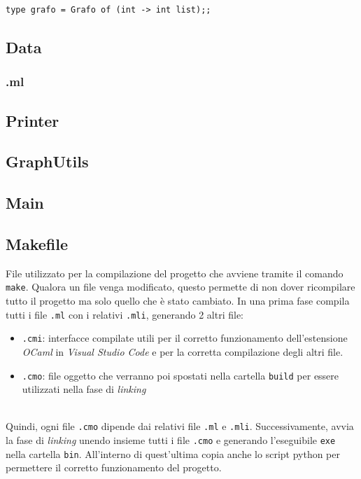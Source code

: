 \begin{lstlisting}[style=caml]
	type grafo = Grafo of (int -> int list);;
\end{lstlisting}

\subsection{Data}
\subsubsection{.ml}

\subsection{Printer}

\subsection{GraphUtils}

\subsection{Main}

\subsection{Makefile}

File utilizzato per la compilazione del progetto che avviene tramite il comando \lstinline[style=cmd]|make|. 
Qualora un file venga modificato, questo permette di non dover ricompilare tutto il progetto ma solo quello che è stato cambiato. In una prima fase compila tutti i file \lstinline[style=cmd]|.ml| con i relativi \lstinline[style=cmd]|.mli|, generando 2 altri file:

\begin{itemize}
	\item \lstinline[style=cmd]|.cmi|: interfacce compilate utili per il corretto funzionamento dell'estensione \textit{OCaml} in \textit{Visual Studio Code} e per la corretta compilazione degli altri file.
	\item \lstinline[style=cmd]|.cmo|: file oggetto che verranno poi spostati nella cartella \lstinline[style=cmd]|build| per essere utilizzati nella fase di \textit{linking}
\end{itemize}
\ \\
Quindi, ogni file \lstinline[style=cmd]|.cmo| dipende dai relativi file \lstinline[style=cmd]|.ml| e \lstinline[style=cmd]|.mli|.
Successivamente, avvia la fase di \textit{linking} unendo insieme tutti i file \lstinline[style=cmd]|.cmo| e generando l'eseguibile \lstinline[style=cmd]|exe| nella cartella \lstinline[style=cmd]|bin|. All'interno di quest'ultima copia anche lo script python per permettere il corretto funzionamento del progetto.

